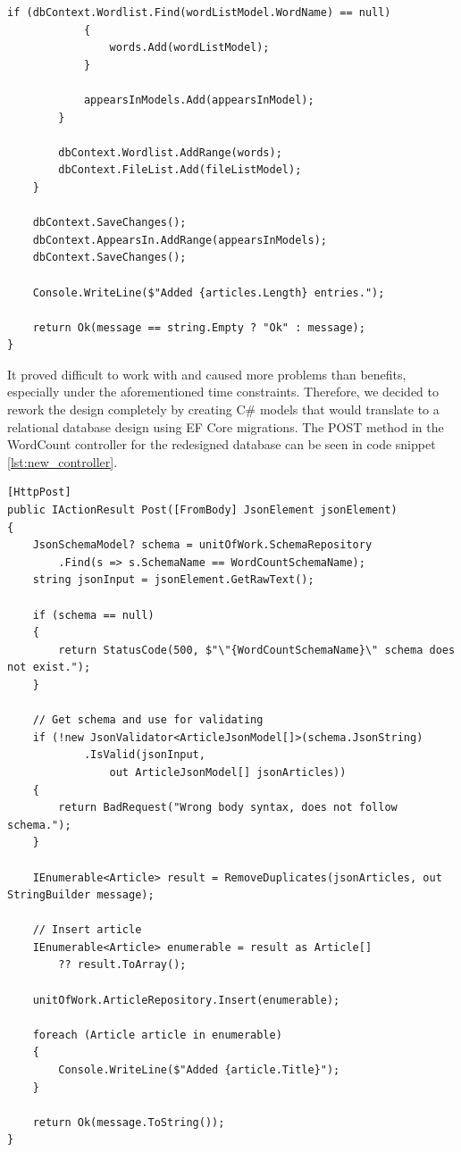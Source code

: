 \begin{lstlisting}[language=CSharp, caption={Old controller}, label={lst:old_controller}]
            if (dbContext.Wordlist.Find(wordListModel.WordName) == null)
            {
                words.Add(wordListModel);
            }

            appearsInModels.Add(appearsInModel);
        }

        dbContext.Wordlist.AddRange(words);
        dbContext.FileList.Add(fileListModel);
    }
        
    dbContext.SaveChanges();
    dbContext.AppearsIn.AddRange(appearsInModels);
    dbContext.SaveChanges();

    Console.WriteLine($"Added {articles.Length} entries.");

    return Ok(message == string.Empty ? "Ok" : message);
}
\end{lstlisting}

It proved difficult to work with and caused more problems than benefits, especially under the aforementioned time constraints. 
Therefore, we decided to rework the design completely by creating C\# models that would translate to a relational database design using EF Core migrations.
The POST method in the WordCount controller for the redesigned database can be seen in code snippet \ref{lst:new_controller}.


\begin{lstlisting}[language=CSharp, caption={New controller}, label={lst:new_controller}]
[HttpPost]
public IActionResult Post([FromBody] JsonElement jsonElement)
{
    JsonSchemaModel? schema = unitOfWork.SchemaRepository
        .Find(s => s.SchemaName == WordCountSchemaName);
    string jsonInput = jsonElement.GetRawText();

    if (schema == null)
    {
        return StatusCode(500, $"\"{WordCountSchemaName}\" schema does not exist.");
    }

    // Get schema and use for validating
    if (!new JsonValidator<ArticleJsonModel[]>(schema.JsonString)
            .IsValid(jsonInput, 
                out ArticleJsonModel[] jsonArticles))
    {
        return BadRequest("Wrong body syntax, does not follow schema.");
    }

    IEnumerable<Article> result = RemoveDuplicates(jsonArticles, out StringBuilder message);

    // Insert article
    IEnumerable<Article> enumerable = result as Article[] 
        ?? result.ToArray();

    unitOfWork.ArticleRepository.Insert(enumerable);

    foreach (Article article in enumerable)
    {
        Console.WriteLine($"Added {article.Title}");
    }

    return Ok(message.ToString());
}
\end{lstlisting}
    
